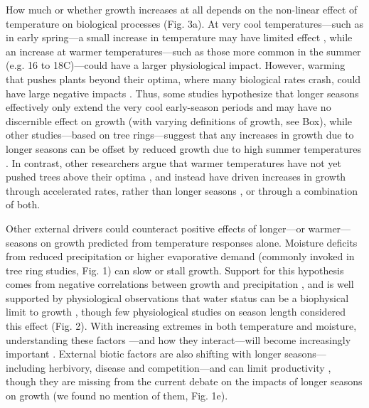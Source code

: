 \documentclass[11pt]{article}
\begin{document}
How much or whether growth increases at all depends on the non-linear effect of temperature on biological processes (Fig. 3a). At very cool temperatures---such as in early spring---a small increase in temperature may have limited effect \citep[or even increase frost risk through early budburst, Fig. 1e,][]{cat2021pep}, while an increase at warmer temperatures---such as those more common in the summer (e.g. 16 to 18\degree C)---could have a larger physiological impact. However, warming that pushes plants beyond their optima, where many biological rates crash, could have large negative impacts \citep{nobel1983biophysical,leuning2002temperature}. Thus, some studies hypothesize that longer seasons effectively only extend the very cool early-season periods and may have no discernible effect on growth (with varying definitions of growth, see Box), while other studies---based on tree rings---suggest that any increases in growth due to longer seasons can be offset by reduced growth due to high summer temperatures \citep[Fig. 1,][]{gantois2022new,dow2022warm}. In contrast, other researchers argue that warmer temperatures have not yet pushed trees above their optima \citep{schaber2002evaluation}, and instead have driven increases in growth through accelerated rates, rather than longer seasons \citep[e.g.][]{ren2019}, or through a combination of both.

Other external drivers could counteract positive effects of longer---or warmer---seasons on growth predicted from temperature responses alone. Moisture deficits from reduced precipitation or higher evaporative demand (commonly invoked in tree ring studies, Fig. 1) can slow or stall growth. Support for this hypothesis comes from negative correlations between growth and precipitation \citep[or other metrics related to plant access to water in tree ring studies,][]{kolavr2016response,etzold2022number}, and is well supported by physiological observations  that water status can be a biophysical limit to growth \citep[i.e., cells cannot expand without sufficient turgor,][]{peters2021turgor,cosgrove2023structure}, though few physiological studies on season length considered this effect (Fig. 2). With increasing extremes in both temperature and moisture, understanding these factors \citep{schuldt2020first}---and how they interact---will become increasingly important \citep{charrier2021interaction}. External biotic factors are also shifting with longer seasons---including herbivory, disease and competition\citep{mitton2012mountain,lange2006thresholds,cleland2024effects}---and can limit productivity \citep{sturrock2011climate,la2008forest,senf2017remote}, though they are missing from the current debate on the impacts of longer seasons on growth (we found no mention of them, Fig. 1e). 
\end{document}
